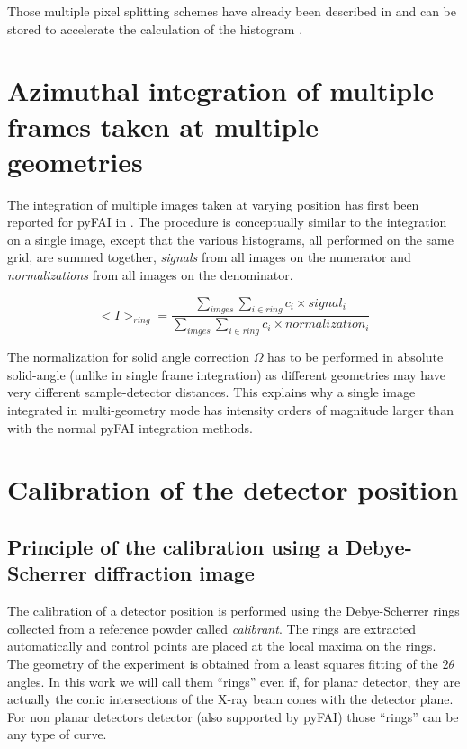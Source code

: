 \documentclass[preprint, pdf]{iucr}              %
\begin{document}
Those multiple pixel splitting schemes have already been described in
 \cite{fv5028} and can be stored to accelerate the calculation of the
histogram  \cite{kieffer_ashiotis-proc-euroscipy-2014}.

\section{Azimuthal integration of multiple frames taken at multiple geometries}

The integration of multiple images taken at varying position has first been
reported for pyFAI in  \cite{PyFAI_PDJ}.
The procedure is conceptually similar to the integration on a single image,
except that the various histograms, all performed on the same grid, are summed
together, \textit{signals} from all images on the numerator and
\textit{normalizations} from all images on the denominator.

$$
<I>_{ring} = \frac{\sum\limits_{imges} \sum\limits_{i \in ring} c_i \times
signal_i} {\sum\limits_{imges} \sum\limits_{i \in ring} c_i \times
normalization_i}
$$

The normalization for solid angle correction $\Omega$ has to be performed in
absolute solid-angle (unlike in single frame integration) as different
geometries may have very different sample-detector distances.
This explains why a single image integrated in multi-geometry mode  has
intensity orders of magnitude larger than with the normal pyFAI integration
methods.

\section{Calibration of the detector position}

\subsection{Principle of the calibration using a Debye-Scherrer diffraction
image}
The calibration of a detector position is performed using the Debye-Scherrer
rings collected from a reference powder called \textit{calibrant}.
The rings are extracted automatically and control points are placed at the
local maxima on the rings.
The geometry of the experiment is obtained from a least squares fitting of
the $2\theta$ angles.
In this work we will call them ``rings'' even if, for planar detector,
they are actually the conic intersections of the X-ray beam cones
with the detector plane.
For non planar detectors detector (also supported by pyFAI) those ``rings'' can
be any type of curve.
\end{document}

